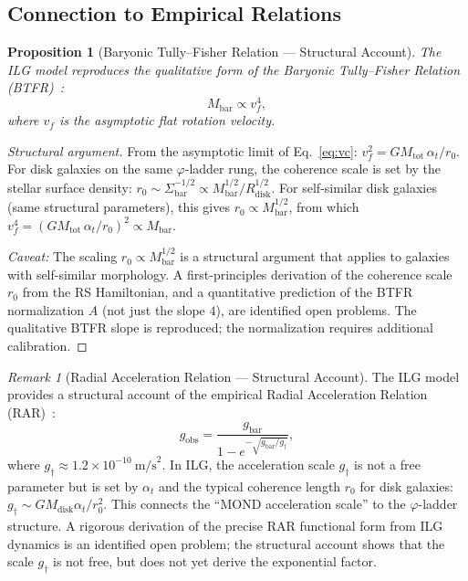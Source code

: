 \documentclass[12pt,a4paper]{article}
\newtheorem{proposition}[theorem]{Proposition}
\theoremstyle{definition}
\theoremstyle{remark}
\newtheorem{remark}[theorem]{Remark}
\begin{document}
\subsection{Connection to Empirical Relations}

\begin{proposition}[Baryonic Tully--Fisher Relation --- Structural Account]
\label{prop:btfr}
The ILG model reproduces the qualitative form of the Baryonic
Tully--Fisher Relation (BTFR)~\cite{McGaugh2000}:
\begin{equation}
  M_{\mathrm{bar}} \propto v_f^4,
\end{equation}
where $v_f$ is the asymptotic flat rotation velocity.
\end{proposition}

\begin{proof}[Structural argument]
From the asymptotic limit of Eq.~\eqref{eq:vc}:
$v_f^2 = GM_{\mathrm{tot}}\,\alpha_t / r_0$.  For disk galaxies
on the same $\varphi$-ladder rung, the coherence scale is set
by the stellar surface density: $r_0 \sim \Sigma_{\mathrm{bar}}^{-1/2}
\propto M_{\mathrm{bar}}^{1/2} / R_{\mathrm{disk}}^{1/2}$.  For
self-similar disk galaxies (same structural parameters), this gives
$r_0 \propto M_{\mathrm{bar}}^{1/2}$, from which
$v_f^4 = (GM_{\mathrm{tot}}\,\alpha_t / r_0)^2 \propto M_{\mathrm{bar}}$.

\emph{Caveat:} The scaling $r_0 \propto M_{\mathrm{bar}}^{1/2}$ is
a structural argument that applies to galaxies with self-similar
morphology.  A first-principles derivation of the coherence scale
$r_0$ from the RS Hamiltonian, and a quantitative prediction of the
BTFR normalization $A$ (not just the slope $4$), are identified open
problems.  The qualitative BTFR slope is reproduced; the normalization
requires additional calibration.
\end{proof}

\begin{remark}[Radial Acceleration Relation --- Structural Account]
\label{rem:rar}
The ILG model provides a structural account of the empirical Radial
Acceleration Relation (RAR)~\cite{McGaugh2016}:
\begin{equation}
  g_{\mathrm{obs}} =
  \frac{g_{\mathrm{bar}}}{1 - e^{-\sqrt{g_{\mathrm{bar}}/g_\dagger}}},
\end{equation}
where $g_\dagger \approx 1.2 \times 10^{-10}~\mathrm{m/s}^2$.
In ILG, the acceleration scale $g_\dagger$ is not a free parameter
but is set by $\alpha_t$ and the typical coherence length $r_0$ for
disk galaxies: $g_\dagger \sim G M_{\mathrm{disk}} \alpha_t / r_0^2$.
This connects the ``MOND acceleration scale'' to the $\varphi$-ladder
structure.  A rigorous derivation of the precise RAR functional form
from ILG dynamics is an identified open problem; the structural account
shows that the scale $g_\dagger$ is not free, but does not yet derive
the exponential factor.
\end{remark}
\end{document}
